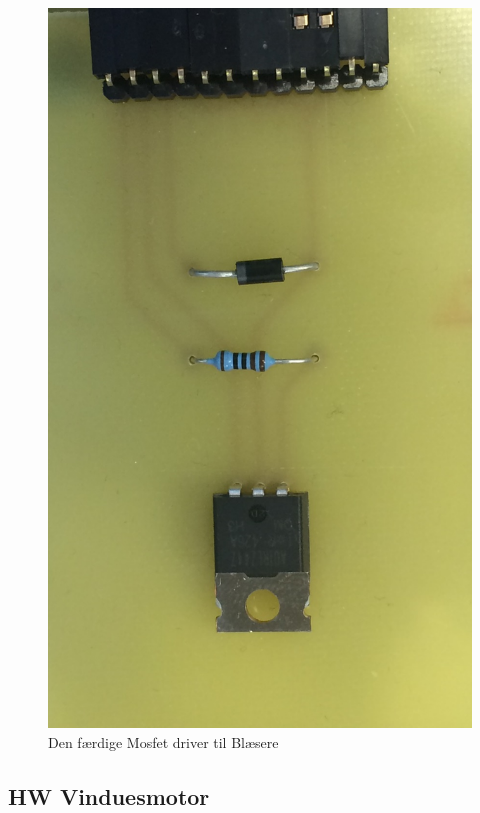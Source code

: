 \begin{figure}[h]
\centering 
\includegraphics[width={\textwidth-5cm}, trim=0 0 0 0, clip=true] {../fig/VentilationPrintBillede} 
\caption{Den færdige Mosfet driver til Blæsere}
\label{fig:blaesere_print}
\end{figure}

\clearpage

\subsection{HW Vinduesmotor}
\label{subsec:vinduesmotor_impl}

